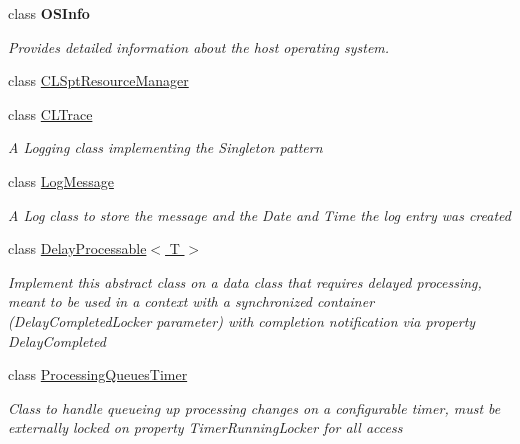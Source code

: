 \begin{DoxyCompactItemize}
\item 
class {\bfseries O\-S\-Info}
\begin{DoxyCompactList}\small\item\em Provides detailed information about the host operating system. \end{DoxyCompactList}\item 
class \hyperlink{class_cloud_api_public_1_1_support_1_1_c_l_spt_resource_manager}{C\-L\-Spt\-Resource\-Manager}
\item 
class \hyperlink{class_cloud_api_public_1_1_support_1_1_c_l_trace}{C\-L\-Trace}
\begin{DoxyCompactList}\small\item\em A Logging class implementing the Singleton pattern \end{DoxyCompactList}\item 
class \hyperlink{class_cloud_api_public_1_1_support_1_1_log_message}{Log\-Message}
\begin{DoxyCompactList}\small\item\em A Log class to store the message and the Date and Time the log entry was created \end{DoxyCompactList}\item 
class \hyperlink{class_cloud_api_public_1_1_support_1_1_delay_processable_3_01_t_01_4}{Delay\-Processable$<$ T $>$}
\begin{DoxyCompactList}\small\item\em Implement this abstract class on a data class that requires delayed processing, meant to be used in a context with a synchronized container (Delay\-Completed\-Locker parameter) with completion notification via property Delay\-Completed \end{DoxyCompactList}\item 
class \hyperlink{class_cloud_api_public_1_1_support_1_1_processing_queues_timer}{Processing\-Queues\-Timer}
\begin{DoxyCompactList}\small\item\em Class to handle queueing up processing changes on a configurable timer, must be externally locked on property Timer\-Running\-Locker for all access \end{DoxyCompactList}\end{DoxyCompactItemize}
